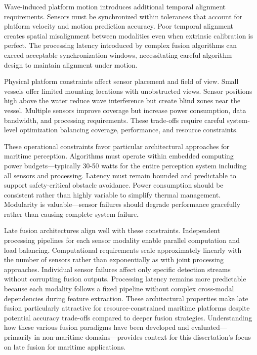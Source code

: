 \documentclass[../main.tex]{subfiles}
\begin{document}
Wave-induced platform motion introduces additional temporal alignment requirements. Sensors must be synchronized within tolerances that account for platform velocity and motion prediction accuracy. Poor temporal alignment creates spatial misalignment between modalities even when extrinsic calibration is perfect. The processing latency introduced by complex fusion algorithms can exceed acceptable synchronization windows, necessitating careful algorithm design to maintain alignment under motion.

Physical platform constraints affect sensor placement and field of view. Small vessels offer limited mounting locations with unobstructed views. Sensor positions high above the water reduce wave interference but create blind zones near the vessel. Multiple sensors improve coverage but increase power consumption, data bandwidth, and processing requirements. These trade-offs require careful system-level optimization balancing coverage, performance, and resource constraints.

These operational constraints favor particular architectural approaches for maritime perception. Algorithms must operate within embedded computing power budgets—typically 30-50 watts for the entire perception system including all sensors and processing. Latency must remain bounded and predictable to support safety-critical obstacle avoidance. Power consumption should be consistent rather than highly variable to simplify thermal management. Modularity is valuable—sensor failures should degrade performance gracefully rather than causing complete system failure.

Late fusion architectures align well with these constraints. Independent processing pipelines for each sensor modality enable parallel computation and load balancing. Computational requirements scale approximately linearly with the number of sensors rather than exponentially as with joint processing approaches. Individual sensor failures affect only specific detection streams without corrupting fusion outputs. Processing latency remains more predictable because each modality follows a fixed pipeline without complex cross-modal dependencies during feature extraction. These architectural properties make late fusion particularly attractive for resource-constrained maritime platforms despite potential accuracy trade-offs compared to deeper fusion strategies. Understanding how these various fusion paradigms have been developed and evaluated—primarily in non-maritime domains—provides context for this dissertation's focus on late fusion for maritime applications.
\end{document}
